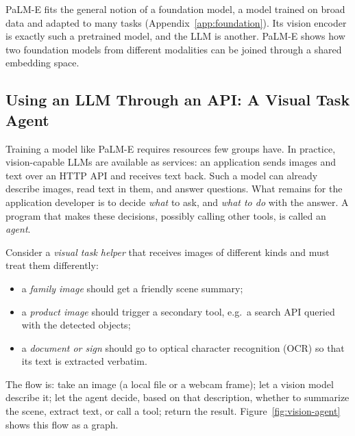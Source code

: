 \noindent
PaLM-E fits the general notion of a foundation model, a model trained on
broad data and adapted to many tasks (Appendix~\ref{app:foundation}). Its
vision encoder is exactly such a pretrained model, and the LLM is another.
PaLM-E shows how two foundation models from different modalities can be
joined through a shared embedding space.

\subsection{Using an LLM Through an API: A Visual Task Agent}

Training a model like PaLM-E requires resources few groups have. In practice,
vision-capable LLMs are available as services: an application sends images
and text over an HTTP API and receives text back. Such a model can already
describe images, read text in them, and answer questions. What remains for
the application developer is to decide \emph{what} to ask, and \emph{what to
do} with the answer. A program that makes these decisions, possibly calling
other tools, is called an \emph{agent}.

Consider a \emph{visual task helper} that receives images of different
kinds and must treat them differently:
\begin{itemize}
  \item a \emph{family image} should get a friendly scene summary;
  \item a \emph{product image} should trigger a secondary tool, e.g.\ a
    search API queried with the detected objects;
  \item a \emph{document or sign} should go to optical character recognition
    (OCR) so that its text is extracted verbatim.
\end{itemize}

\noindent
The flow is: take an image (a local file or a webcam frame); let a vision
model describe it; let the agent decide, based on that description, whether
to summarize the scene, extract text, or call a tool; return the result.
Figure~\ref{fig:vision-agent} shows this flow as a graph.

